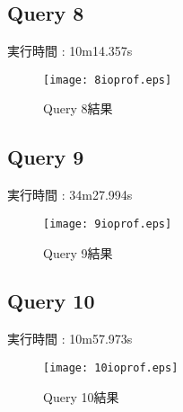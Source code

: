 \documentclass[11pt,a4paper]{jsarticle}
\begin{document}
\subsection{Query 8}
実行時間 : 10m14.357s

\begin{figure}[thbp]
 \begin{center}
  \texttt{[image: 8ioprof.eps]}
 \end{center}
 \caption{Query 8結果}
 \label{fig:q8}
\end{figure}

\subsection{Query 9}
実行時間 : 34m27.994s

\begin{figure}[thbp]
 \begin{center}
  \texttt{[image: 9ioprof.eps]}
 \end{center}
 \caption{Query 9結果}
 \label{fig:q9}
\end{figure}

\subsection{Query 10}
実行時間 : 10m57.973s

\begin{figure}[thbp]
 \begin{center}
  \texttt{[image: 10ioprof.eps]}
 \end{center}
 \caption{Query 10結果}
 \label{fig:q10}
\end{figure}
\end{document}
